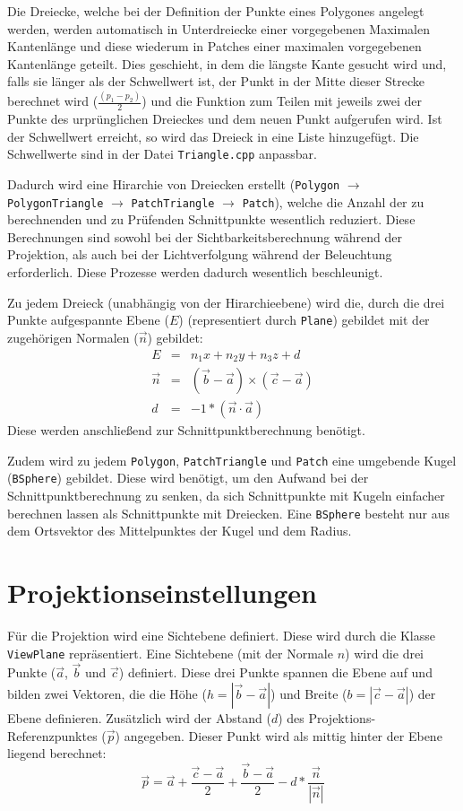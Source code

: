 \documentclass[final,a4paper,11pt,notitlepage,halfparskip]{scrreprt}
\begin{document}
Die Dreiecke, welche bei der Definition der Punkte eines Polygones angelegt
werden, werden automatisch in Unterdreiecke einer vorgegebenen Maximalen
Kantenlänge und diese wiederum in Patches einer maximalen vorgegebenen
Kantenlänge geteilt. Dies geschieht, in dem die längste Kante gesucht wird und,
falls sie länger als der Schwellwert ist, der Punkt in der Mitte dieser Strecke
berechnet wird ($\frac{(p_1 - p_2)}{2}$) und die Funktion zum Teilen mit jeweils zwei 
der Punkte des urprünglichen Dreieckes und dem neuen Punkt aufgerufen wird. 
Ist der Schwellwert erreicht, so wird das Dreieck in eine Liste hinzugefügt. 
Die Schwellwerte sind in der Datei \texttt{Triangle.cpp} anpassbar.

Dadurch wird eine Hirarchie von Dreiecken erstellt (\texttt{Polygon} 
$\rightarrow$ \texttt{PolygonTriangle} $\rightarrow$ \texttt{PatchTriangle} 
$\rightarrow$ \texttt{Patch}), welche die Anzahl der zu berechnenden und zu
Prüfenden Schnittpunkte wesentlich reduziert. Diese Berechnungen sind sowohl bei
der Sichtbarkeitsberechnung während der Projektion, als auch bei der
Lichtverfolgung während der Beleuchtung erforderlich. Diese Prozesse werden
dadurch wesentlich beschleunigt.

Zu jedem Dreieck (unabhängig von der Hirarchieebene) wird die, durch die drei
Punkte aufgespannte Ebene ($E$) (representiert durch \texttt{Plane}) gebildet 
mit der zugehörigen Normalen ($\vec{n}$) gebildet:
\begin{eqnarray*}
    E &=& n_1x + n_2y + n_3z + d\\
    \vec{n} &=& (\vec{b} - \vec{a}) \times (\vec{c} - \vec{a})\\
    d &=& -1 * (\vec{n} \cdot \vec{a})
\end{eqnarray*}
Diese werden anschließend zur Schnittpunktberechnung benötigt.

Zudem wird zu jedem \texttt{Polygon}, \texttt{PatchTriangle} und
\texttt{Patch} eine umgebende Kugel (\texttt{BSphere}) gebildet. Diese wird
benötigt, um den Aufwand bei der Schnittpunktberechnung zu senken, da sich
Schnittpunkte mit Kugeln einfacher berechnen lassen als Schnittpunkte mit
Dreiecken. Eine \texttt{BSphere} besteht nur aus dem Ortsvektor des
Mittelpunktes der Kugel und dem Radius.

\section{Projektionseinstellungen}
Für die Projektion wird eine Sichtebene definiert. Diese wird durch die Klasse
\texttt{ViewPlane} repräsentiert. Eine Sichtebene (mit der Normale $n$) wird die 
drei Punkte ($\vec{a}$, $\vec{b}$ und $\vec{c}$) definiert. Diese drei Punkte 
spannen die Ebene auf und bilden zwei Vektoren, die die Höhe ($h = |\vec{b} - \vec{a}|$) 
und Breite ($b = |\vec{c} - \vec{a}|$) der Ebene definieren. Zusätzlich wird 
der Abstand ($d$) des Projektions-Referenzpunktes ($\vec{p}$) angegeben. Dieser 
Punkt wird als mittig hinter der Ebene liegend berechnet:
$$\vec{p} = \vec{a} + \frac{\vec{c} - \vec{a}}{2} + \frac{\vec{b} - \vec{a}}{2}
- d * \frac{\vec{n}}{|\vec{n}|}$$
\end{document}
